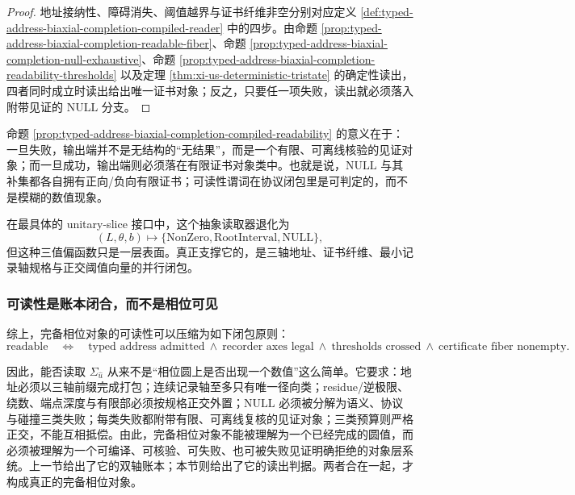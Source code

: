 \begin{proof}
地址接纳性、障碍消失、阈值越界与证书纤维非空分别对应定义 \ref{def:typed-address-biaxial-completion-compiled-reader} 中的四步。由命题 \ref{prop:typed-address-biaxial-completion-readable-fiber}、命题 \ref{prop:typed-address-biaxial-completion-null-exhaustive}、命题 \ref{prop:typed-address-biaxial-completion-readability-thresholds} 以及定理 \ref{thm:xi-us-deterministic-tristate} 的确定性读出，四者同时成立时读出给出唯一证书对象；反之，只要任一项失败，读出就必须落入附带见证的 \(\mathrm{NULL}\) 分支。
\end{proof}

命题 \ref{prop:typed-address-biaxial-completion-compiled-readability} 的意义在于：一旦失败，输出端并不是无结构的“无结果”，而是一个有限、可离线核验的见证对象；而一旦成功，输出端则必须落在有限证书对象类中。也就是说，\(\mathrm{NULL}\) 与其补集都各自拥有正向/负向有限证书；可读性谓词在协议闭包里是可判定的，而不是模糊的数值现象。

在最具体的 unitary-slice 接口中，这个抽象读取器退化为
\[
(L,\theta,b)\longmapsto \{\mathrm{NonZero},\mathrm{RootInterval},\mathrm{NULL}\},
\]
但这种三值偏函数只是一层表面。真正支撑它的，是三轴地址、证书纤维、最小记录轴规格与正交阈值向量的并行闭包。

\subsubsection{可读性是账本闭合，而不是相位可见}\label{subsubsec:typed-address-biaxial-completion-readability-summary}
综上，完备相位对象的可读性可以压缩为如下闭包原则：
\[
\text{readable}
\quad\Longleftrightarrow\quad
\text{typed address admitted}
\ \land\
\text{recorder axes legal}
\ \land\
\text{thresholds crossed}
\ \land\
\text{certificate fiber nonempty}.
\]

因此，能否读取 \(\Sigma_{\hat u}\) 从来不是“相位圆上是否出现一个数值”这么简单。它要求：地址必须以三轴前缀完成打包；连续记录轴至多只有唯一径向类；residue/逆极限、绕数、端点深度与有限部必须按规格正交外置；\(\mathrm{NULL}\) 必须被分解为语义、协议与碰撞三类失败；每类失败都附带有限、可离线复核的见证对象；三类预算则严格正交，不能互相抵偿。由此，完备相位对象不能被理解为一个已经完成的圆值，而必须被理解为一个可编译、可核验、可失败、也可被失败见证明确拒绝的对象层系统。上一节给出了它的双轴账本；本节则给出了它的读出判据。两者合在一起，才构成真正的完备相位对象。
